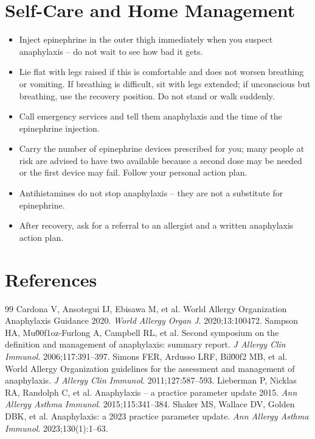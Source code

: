 \section*{Self-Care and Home Management}
\begin{itemize}
  \item Inject epinephrine in the outer thigh immediately when you suspect anaphylaxis -- do not wait to see how bad it gets.
  \item Lie flat with legs raised if this is comfortable and does not worsen breathing or vomiting. If breathing is difficult, sit with legs extended; if unconscious but breathing, use the recovery position. Do not stand or walk suddenly.
  \item Call emergency services and tell them anaphylaxis and the time of the epinephrine injection.
  \item Carry the number of epinephrine devices prescribed for you; many people at risk are advised to have two available because a second dose may be needed or the first device may fail. Follow your personal action plan.
  \item Antihistamines do not stop anaphylaxis -- they are not a substitute for epinephrine.
  \item After recovery, ask for a referral to an allergist and a written anaphylaxis action plan.
\end{itemize}

\section*{References}
\begin{thebibliography}{99}
 Cardona V, Ansotegui IJ, Ebisawa M, et al. World Allergy Organization Anaphylaxis Guidance 2020. \textit{World Allergy Organ J}. 2020;13:100472.
 Sampson HA, Mu\u00f1oz-Furlong A, Campbell RL, et al. Second symposium on the definition and management of anaphylaxis: summary report. \textit{J Allergy Clin Immunol}. 2006;117:391--397.
 Simons FER, Ardusso LRF, Bil\u00f2 MB, et al. World Allergy Organization guidelines for the assessment and management of anaphylaxis. \textit{J Allergy Clin Immunol}. 2011;127:587--593.
 Lieberman P, Nicklas RA, Randolph C, et al. Anaphylaxis -- a practice parameter update 2015. \textit{Ann Allergy Asthma Immunol}. 2015;115:341--384.
 Shaker MS, Wallace DV, Golden DBK, et al. Anaphylaxis: a 2023 practice parameter update. \textit{Ann Allergy Asthma Immunol}. 2023;130(1):1--63.
\end{thebibliography}
